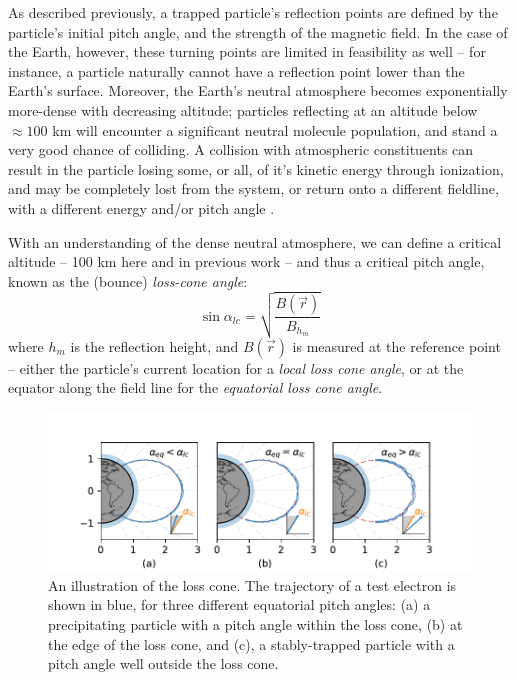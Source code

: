 As described previously, a trapped particle's reflection points are defined by the particle's initial pitch angle, and the strength of the magnetic field. In the case of the Earth, however, these turning points are limited in feasibility as well -- for instance, a particle naturally cannot have a reflection point lower than the Earth's surface. Moreover, the Earth's neutral atmosphere becomes exponentially more-dense with decreasing altitude; particles reflecting at an altitude below $\approx 100$ km will encounter a significant neutral molecule population, and stand a very good chance of colliding. A collision with atmospheric constituents can result in the particle losing some, or all, of it's kinetic energy through ionization, and may be completely lost from the system, or return onto a different fieldline, with a different energy and/or pitch angle \citep{Cotts2011}.

With an understanding of the dense neutral atmosphere, we can define a critical altitude -- 100 km here and in previous work \citep{Marshall2018}-- and thus a critical pitch angle, known as the (bounce) \emph{loss-cone angle}:
\begin{equation}
\sin \alpha_{lc} = \sqrt{\frac{B(\vec{r})}{B_{h_m}}}
\end{equation}
where $h_m$ is the reflection height, and $B(\vec{r})$ is measured at the reference point -- either the particle's current location for a \emph{local loss cone angle}, or at the equator along the field line for the \emph{equatorial loss cone angle}.

\begin{figure}[h]
\begin{center}
\includegraphics[width=\textwidth]{figures/pitchangle_trapping_3up.pdf}
\caption[Loss cone illustration]{An illustration of the loss cone. The trajectory of a test electron is shown in blue, for three different equatorial pitch angles: (a) a precipitating particle with a pitch angle within the loss cone,  (b) at the edge of the loss cone, and (c), a stably-trapped particle with a pitch angle well outside the loss cone.}
\label{fig:loss_cone_examples}
\end{center}
\end{figure}


